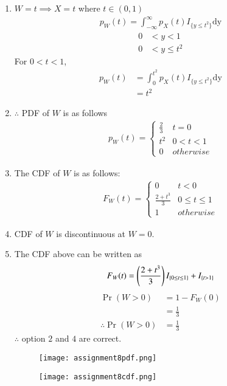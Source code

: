 \documentclass[journal,12pt,twocolumn]{IEEEtran}
\begin{document}
\begin{enumerate}
\item $W=t \implies X=t $ where $t \in (0,1)$
\begin{align}
p_{W}(t) = \int_{- \infty}^{\infty} p_X(t)I_{\{y\leq t^2\}} \mathrm{dy}
\end{align}
\begin{align}
   0 &< y < 1 \label{16} \\
   0 &< y \leq t^2  \label{17}
\end{align}
For $ 0 < t < 1 $,
\begin{align}
p_W(t) &= \int_{0}^{t^2} p_X(t)I_{\{y\leq t^2\}} \mathrm{dy} \\
       &= t^2 \label{18}
\end{align}
\item $\therefore$ PDF of $W$ is as follows
\begin{align}
p_{W}(t)  = 
\begin{cases}
  \frac{2}{3}& t=0 \\
  t^2 & 0 < t < 1 \\
  0 & otherwise
\end{cases} \label{19}
\end{align}
\item The CDF  of $W$ is as follows:
\begin{align}
F_W(t)  = 
\begin{cases}
  0 & t<0 \\
  \frac{2+t^3}{3}& 0 \leq t\leq 1\\
  1 & otherwise
\end{cases} \label{20}
\end{align}
\item CDF of $W$ is discontinuous at $W=0$.\\
\item The CDF above can be written as
\begin{align}
  F_W(t)=\left(\frac{2+t^3}{3}\right)I_{\{0\leq t \leq 1\}}+ I_{\{t > 1\}}
\end{align}
\begin{align}
\Pr(W > 0)&= 1- F_W(0) \\
           &=\frac{1}{3} \label{21} \\
\therefore \Pr(W>0)&=\frac{1}{3}
\end{align}
$\therefore$ option $2$ and $4$ are correct.
\begin{figure}[htb!]
\begin{center}
\texttt{[image: assignment8pdf.png]}
\end{center}
\end{figure}

\begin{figure}[htb!]
\begin{center}
\texttt{[image: assignment8cdf.png]}
\end{center}
\end{figure}
\end{enumerate}
\end{document}
